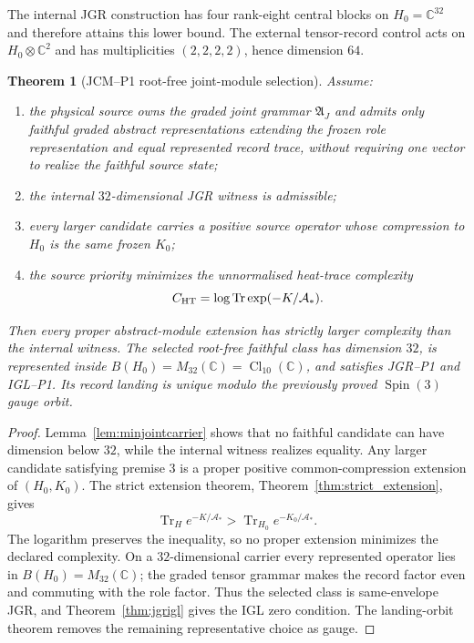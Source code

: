 \documentclass[11pt,a4paper]{article}
\newtheorem{theorem}[definition]{Theorem}
\theoremstyle{remark}
\begin{document}
The internal JGR construction has four rank-eight central blocks on
$H_0=\mathbb C^{32}$ and therefore attains this lower bound.  The external
tensor-record control acts on $H_0\otimes\mathbb C^2$ and has multiplicities
$(2,2,2,2)$, hence dimension $64$.

\begin{theorem}[JCM--P1 root-free joint-module selection]
Assume:
\begin{enumerate}
 \item the physical source owns the graded joint grammar $\mathfrak A_J$ and
 admits only faithful graded abstract representations extending the frozen
 role representation and equal represented record trace, without requiring
 one vector to realize the faithful source state;
 \item the internal $32$-dimensional JGR witness is admissible;
 \item every larger candidate carries a positive source operator whose
 compression to $H_0$ is the same frozen $K_0$;
 \item the source priority minimizes the unnormalised heat-trace complexity
 \begin{equation*}
  C_{\rm HT}=\log\operatorname{Tr}\exp(-K/\mathcal A_*).
 \end{equation*}
\end{enumerate}
Then every proper abstract-module extension has strictly larger complexity
than the internal witness.  The selected root-free faithful class has
dimension $32$, is
represented inside
$B(H_0)=M_{32}(\mathbb C)=\operatorname{Cl}_{10}(\mathbb C)$, and satisfies
JGR--P1 and IGL--P1.  Its record landing is unique modulo the previously
proved $\operatorname{Spin}(3)$ gauge orbit.
\label{thm:jcmselection}
\end{theorem}

\begin{proof}
Lemma~\ref{lem:minjointcarrier} shows that no faithful candidate can have
dimension below $32$, while the internal witness realizes equality.  Any
larger candidate satisfying premise 3 is a proper positive
common-compression extension of $(H_0,K_0)$.  The strict extension theorem,
Theorem~\ref{thm:strict_extension}, gives
\begin{equation}
 \operatorname{Tr}_{H}e^{-K/\mathcal A_*}
 >\operatorname{Tr}_{H_0}e^{-K_0/\mathcal A_*}.
 \label{eq:jcmstrict}
\end{equation}
The logarithm preserves the inequality, so no proper extension minimizes the
declared complexity.  On a $32$-dimensional carrier every represented
operator lies in $B(H_0)=M_{32}(\mathbb C)$; the graded tensor grammar makes
the record factor even and commuting with the role factor.  Thus the selected
class is same-envelope JGR, and Theorem~\ref{thm:jgrigl} gives the IGL zero
condition.  The landing-orbit theorem removes the remaining representative
choice as gauge.
\end{proof}
\end{document}
